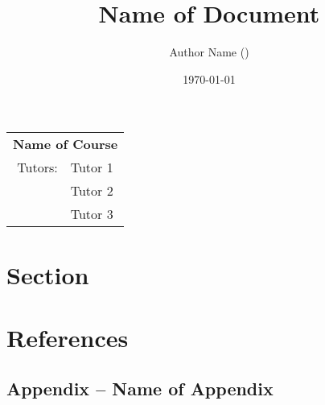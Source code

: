 \documentclass[a4paper, 12pt]{article}
\begin{document}
	\title{Name of Document}
	\author{Author Name ()}
	\date{\today}

    \makeatletter
    \let\headerauthor\@author
    \let\headertitle\@title
    \makeatother

	\begin{titlepage}
		\hypersetup{pageanchor=false} %
		\maketitle 
		\thispagestyle{fancy}
		\headheight 35pt
		\rhead{\small\today}
		
		\begin{table}[b]	
			\begin{center}
				\begin{tabular}{rl}
					\multicolumn{2}{c}{\textbf{Name of Course}}\\
					Tutors: & Tutor 1\\
					& Tutor 2\\
                    & Tutor 3
				\end{tabular}
			\end{center}
		\end{table}
	\end{titlepage}
\clearpage
\hypersetup{pageanchor=true} %
	\pagestyle{fancy}
	\headheight 36pt 
	\rhead{\small \headertitle\\\today}
	\lhead{\small \headerauthor}
	\cfoot{\thepage}
	\tableofcontents
\clearpage
    \section{Section}
        \label{sec:section}
\clearpage
    \section{References}
        \label{sec:references}
        \setcounter{biburllcpenalty}{9000}
        \setcounter{biburlucpenalty}{9000}
        \printbibliography[heading=none]
\clearpage
	\begin{appendices}
		\renewcommand{\theequation}{\Alph{section}.\arabic{equation}}
		\setcounter{equation}{0}
		\renewcommand{\thefigure}{\Alph{section}.\arabic{figure}}
		\setcounter{figure}{0}
		\renewcommand{\thetable}{\Alph{section}.\arabic{table}}
		\setcounter{table}{0}
		\renewcommand{\thelisting}{\Alph{section}.\arabic{listing}}
		\setcounter{listing}{0}
        \section{Appendix -- Name of Appendix}
            \label{sec:appndixname}
    \end{appendices}
\end{document}
